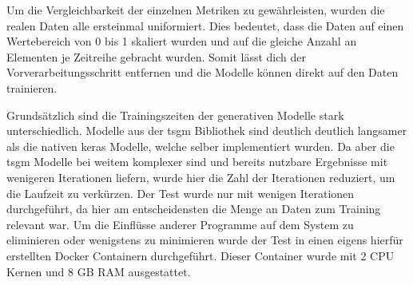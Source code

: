 Um die Vergleichbarkeit der einzelnen Metriken zu gewährleisten, wurden die realen Daten alle ersteinmal uniformiert. Dies bedeutet, dass die Daten auf einen Wertebereich von 0 bis 1 skaliert wurden und auf die gleiche Anzahl an Elementen je Zeitreihe gebracht wurden.
Somit lässt dich der Vorverarbeitungsschritt entfernen und die Modelle können direkt auf den Daten trainieren.

Grundsätzlich sind die Trainingszeiten der generativen Modelle stark unterschiedlich. Modelle aus der tsgm Bibliothek \cite{nikitin2023tsgm} sind deutlich deutlich langsamer als die nativen keras Modelle, welche selber implementiert wurden.
Da aber die tsgm Modelle bei weitem komplexer sind und bereits nutzbare Ergebnisse mit wenigeren Iterationen liefern, wurde hier die Zahl der Iterationen reduziert, um die Laufzeit zu verkürzen.
Der Test wurde nur mit wenigen Iterationen durchgeführt, da hier am entscheidensten die Menge an Daten zum Training relevant war.
Um die Einflüsse anderer Programme auf dem System zu eliminieren oder wenigstens zu minimieren wurde der Test in einen eigens hierfür erstellten Docker Containern durchgeführt. Dieser Container wurde mit 2 \ac{CPU} Kernen und 8 \ac{GB} \ac{RAM} ausgestattet.

